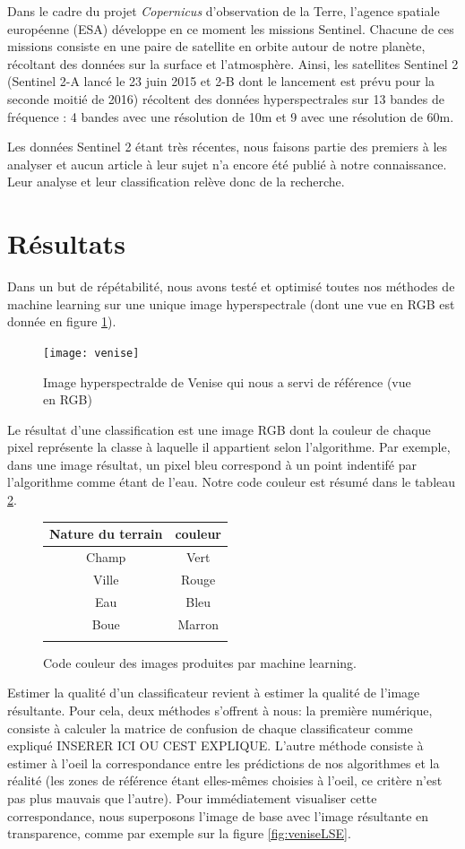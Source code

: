 \documentclass[a4paper,10pt]{article}
\begin{document}
Dans le cadre du projet \textit{Copernicus} d'observation de la Terre, l'agence spatiale européenne (ESA) développe en ce moment les missions Sentinel. Chacune de ces missions consiste en une paire de satellite en orbite autour de notre planète, récoltant des données sur la surface et l'atmosphère. Ainsi, les satellites Sentinel 2 (Sentinel 2-A lancé le 23 juin 2015 et 2-B dont le lancement est prévu pour la seconde moitié de 2016)\cite{sent2} récoltent des données hyperspectrales sur 13 bandes de fréquence : 4 bandes avec une résolution de 10m et 9 avec une résolution de 60m.

Les données Sentinel 2 étant très récentes, nous faisons partie des premiers à les analyser et aucun article à leur sujet n'a encore été publié à notre connaissance. Leur analyse et leur classification relève donc de la recherche.

\section{Résultats}
Dans un but de répétabilité, nous avons testé et optimisé toutes nos méthodes de machine learning sur une unique image hyperspectrale (dont une vue en RGB est donnée en figure \ref{fig:veniseRGB}).
\begin{figure}
  \centering
    \texttt{[image: venise]}
  \caption{Image hyperspectralde de Venise qui nous a servi de référence (vue en RGB)}
  \label{fig:veniseRGB}
\end{figure}
Le résultat d'une classification est une image RGB dont la couleur de chaque pixel représente la classe à laquelle il appartient selon l'algorithme. Par exemple, dans une image résultat, un pixel bleu correspond à un point indentifé par l'algorithme comme étant de l'eau. Notre code couleur est résumé dans le tableau \ref{table:codeCouleur}.
\begin{figure}
 \begin{center}
  \begin{tabular}{|c|c|}
    \hline
    Nature du terrain & couleur \\
    \hline
  Champ & Vert \\
  Ville &  Rouge \\
  Eau &  Bleu \\
  Boue & Marron \\
    \hline
  \label{table:codeCouleur}
  \end{tabular}
\caption{Code couleur des images produites par machine learning.} 
\end{center}
\end{figure}
Estimer la qualité d'un classificateur revient à estimer la qualité de l'image résultante. Pour cela, deux méthodes s'offrent à nous: la première numérique, consiste à calculer la matrice de confusion de chaque classificateur comme expliqué INSERER ICI OU CEST EXPLIQUE. L'autre méthode consiste à estimer à l'oeil la correspondance entre les prédictions de nos algorithmes et la réalité (les zones de référence étant elles-mêmes choisies à l'oeil, ce critère n'est pas plus mauvais que l'autre). Pour immédiatement visualiser cette correspondance, nous superposons l'image de base avec l'image résultante en transparence, comme par exemple sur la figure \ref{fig:veniseLSE}.
\end{document}
